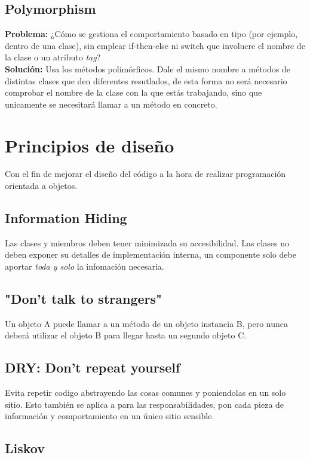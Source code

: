 \documentclass[11pt]{article}
\theoremstyle{plain}
\begin{document}
        \subsection{Polymorphism} %
        \label{sub:polymorphism}
        \begin{center}
            \textbf{Problema:} ¿Cómo se gestiona el comportamiento basado en tipo (por ejemplo, dentro de una clase), sin emplear if-then-else ni switch que involucre el nombre de la clase o un atributo \textit{tag}?\\ 
            \textbf{Solución:} Usa los métodos polimórficos. Dale el mismo nombre a métodos de distintas clases que den diferentes resutlados, de esta forma no será necesario comprobar el nombre de la clase con la que estás trabajando, sino que unicamente se necesitará llamar a un método en concreto.
        \end{center}
    \section{Principios de diseño} %
    \label{sec:principios_de_diseño}
        Con el fin de mejorar el diseño del código a la hora de realizar programación orientada a objetos.
        \subsection{Information Hiding} %
        \label{sub:information_hiding}
            Las clases y miembros deben tener minimizada su accesibilidad. Las clases no deben exponer su detalles de implementación interna, un componente solo debe aportar \textit{toda y solo} la infomación necesaria.
        \subsection{"Don't talk to strangers"} %
        \label{sub:_don_t_talk_to_strangers_}
            Un objeto A puede llamar a un método de un objeto instancia B, pero nunca deberá utilizar el objeto B para llegar hasta un segundo objeto C.
        
        \subsection{DRY: Don't repeat yourself} %
        \label{sub:dry_don_t_repeat_yourself}
            Evita repetir codigo abstrayendo las cosas comunes y poniendolas en un solo sitio. Esto también se aplica a para las responsabilidades, pon cada pieza de información y comportamiento en un único sitio sensible.
       \subsection{Liskov} %
        \label{sub:liskov}
        
\end{document}
